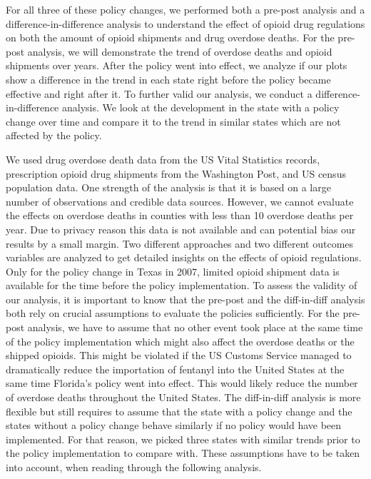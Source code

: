 \documentclass[12pt,letterpaper]{article}
\begin{document}
For all three of these policy changes, we performed both a pre-post analysis and a difference-in-difference analysis to understand the effect of opioid drug regulations on both the amount of opioid shipments and drug overdose deaths. For the pre-post analysis, we will demonstrate the trend of overdose deaths and opioid shipments over years. After the policy went into effect, we analyze if our plots show a difference in the trend in each state right before the policy became effective and right after it. To further valid our analysis, we conduct a difference-in-difference analysis. We look at the development in the state with a policy change over time and compare it to the trend in similar states which are not affected by the policy.

We used drug overdose death data from the US Vital Statistics records, prescription opioid drug shipments from the Washington Post, and US census population data. One strength of the analysis is that it is based on a large number of observations and credible data sources. However, we cannot evaluate the effects on overdose deaths in counties with less than 10 overdose deaths per year. Due to privacy reason this data is not available and can potential bias our results by a small margin. Two different approaches and two different outcomes variables are analyzed to get detailed insights on the effects of opioid regulations. Only for the policy change in Texas in 2007, limited opioid shipment data is available for the time before the policy implementation. To assess the validity of our analysis, it is important to know that the pre-post and the diff-in-diff analysis both rely on crucial assumptions to evaluate the policies sufficiently. For the pre-post analysis, we have to assume that no other event took place at the same time of the policy implementation which might also affect the overdose deaths or the shipped opioids. This might be violated if the US Customs Service managed to dramatically reduce the importation of fentanyl into the United States at the same time Florida's policy went into effect. This would likely reduce the number of overdose deaths throughout the United States. The diff-in-diff analysis is more flexible but still requires to assume that the state with a policy change and the states without a policy change behave similarly if no policy would have been implemented. For that reason, we picked three states with similar trends prior to the policy implementation to compare with. These assumptions have to be taken into account, when reading through the following analysis. 
\end{document}
